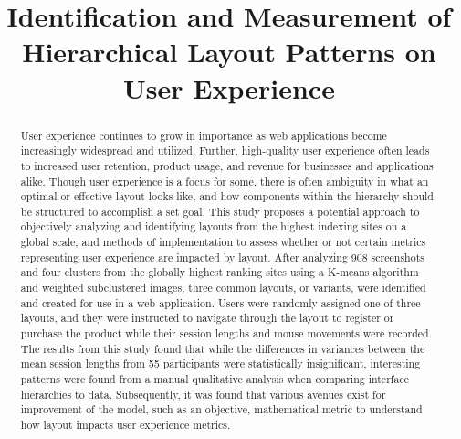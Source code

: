 \documentclass[conference]{IEEEtran}
\begin{document}
\title{Identification and Measurement of Hierarchical Layout Patterns on User Experience\\}

\author{}

\maketitle

\begin{abstract}
User experience continues to grow in importance as web applications become increasingly widespread and utilized. Further, high-quality user experience often leads to increased user retention, product usage, and revenue for businesses and applications alike. Though user experience is a focus for some, there is often ambiguity in what an optimal or effective layout looks like, and how components within the hierarchy should be structured to accomplish a set goal. This study proposes a potential approach to objectively analyzing and identifying layouts from the highest indexing sites on a global scale, and methods of implementation to assess whether or not certain metrics representing user experience are impacted by layout. After analyzing 908 screenshots and four clusters from the globally highest ranking sites using a K-means algorithm and weighted subclustered images, three common layouts, or variants, were identified and created for use in a web application. Users were randomly assigned one of three layouts, and they were instructed to navigate through the layout to register or purchase the product while their session lengths and mouse movements were recorded. The results from this study found that while the differences in variances between the mean session lengths from 55 participants were statistically insignificant, interesting patterns were found from a manual qualitative analysis when comparing interface hierarchies to data. Subsequently, it was found that various avenues exist for improvement of the model, such as an objective, mathematical metric to understand how layout impacts user experience metrics.
\end{abstract}
\end{document}
